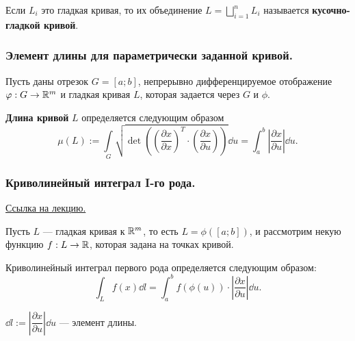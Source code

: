 \begin{definition*}
    Если $L_i$ это гладкая кривая, то их объединение $L = \bigsqcup_{i=1}^{n} L_i$ называется \textbf{кусочно-гладкой кривой}.   
\end{definition*}

\subsubsection{Элемент длины для параметрически заданной кривой.}

Пусть даны отрезок $G = [a; b]$, непрерывно дифференцируемое отображение $\varphi: G \to \mathbb{R}^m$ и гладкая кривая $L$, которая задается через $G$ и $\phi$.

\begin{definition*}
    \textbf{Длина кривой} $L$ определяется следующим образом
    \begin{equation*}
        \mu(L) := 
        \underset{G}{\int} \sqrt{\det \left( \left( \dfrac{\partial x}{\partial x} \right)^T \cdot \left( \dfrac{\partial x}{\partial u} \right) \right)} \dd u
        = \int_a^b \left| \dfrac{\partial x}{\partial u} \right| \dd u.
    \end{equation*} 
\end{definition*}

\subsubsection{Криволинейный интеграл I-го рода.}

\href{https://youtu.be/h_VmHDiSPJI?list=PLEwK9wdS5g0qV-430pfXzTawd6pI_VUgq&t=3109}{Ссылка на лекцию.}

Пусть $L$ --- гладкая кривая к $\mathbb{R}^m$, то есть $L = \phi([a; b])$, и рассмотрим некую функцию $f: L \to \mathbb{R}$, которая задана на точках кривой.

\begin{definition*}
    Криволинейный интеграл первого рода определяется следующим образом:
    \begin{equation*}
        \int_L f(x) \dd l
        = \int_a^b f(\phi(u)) \cdot \left| \dfrac{\partial x}{\partial u} \right| \dd u.
    \end{equation*}

    $\dd l := \left| \dfrac{\partial x}{\partial u} \right| \dd u$ --- элемент длины. 
\end{definition*}
